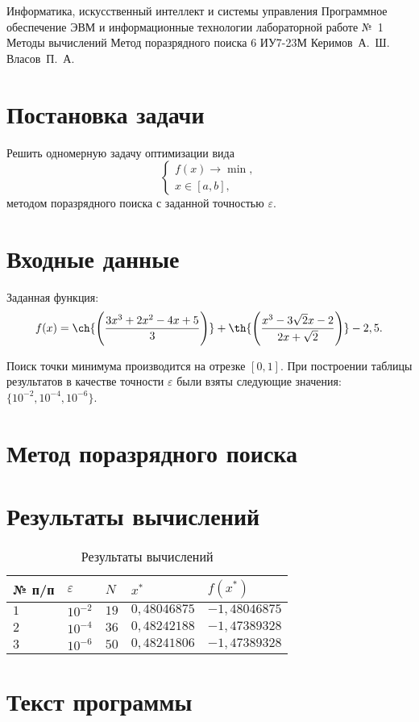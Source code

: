 \documentclass{bmstu-gost-7-32}
\begin{document}
\makereporttitle
	{Информатика, искусственный интеллект и системы управления} %
	{Программное обеспечение ЭВМ и информационные технологии} %
	{лабораторной работе №~1} %
	{Методы вычислений} %
	{Метод поразрядного поиска} %
	{6} %
	{ИУ7-23М} %
	{Керимов~А.~Ш.} %
	{Власов~П.~А.} %

\section*{Постановка задачи}

Решить одномерную задачу оптимизации вида
\begin{equation}
	\begin{cases}
		f(x) \to \min, \\
		x \in [a, b],
	\end{cases}
\end{equation}
методом поразрядного поиска с заданной точностью $\varepsilon$.

\section*{Входные данные}

Заданная функция:
\begin{equation}
	f(x) = \ch{\left(\frac{3x^3 + 2x^2 - 4x + 5}{3}\right)} + \th{\left(\frac{x^3 - 3\sqrt2x - 2}{2x + \sqrt2}\right)} - 2,5.
\end{equation}

Поиск точки минимума производится на отрезке $[0, 1]$.
При построении таблицы результатов в качестве точности $\varepsilon$ были взяты следующие значения: $\{10^{-2}, 10^{-4}, 10^{-6}\}$.

\section*{Метод поразрядного поиска}


\section*{Результаты вычислений}

\begin{table}[H]
	\caption{Результаты вычислений}
	\begin{tabular}{|l|l|l|l|l|}
		\hline
		№ п/п & $\varepsilon$ & $N$  & $x^*$     & $f(x^*)$   \\ \hline
		$1$   & $10^{-2}$     & $19$ & $0,48046875$ & $-1,48046875$ \\ \hline
		$2$   & $10^{-4}$     & $36$ & $0,48242188$ & $-1,47389328$ \\ \hline
		$3$   & $10^{-6}$     & $50$ & $0,48241806$ & $-1,47389328$ \\ \hline
	\end{tabular}
\end{table}

\section*{Текст программы}


\end{document}
